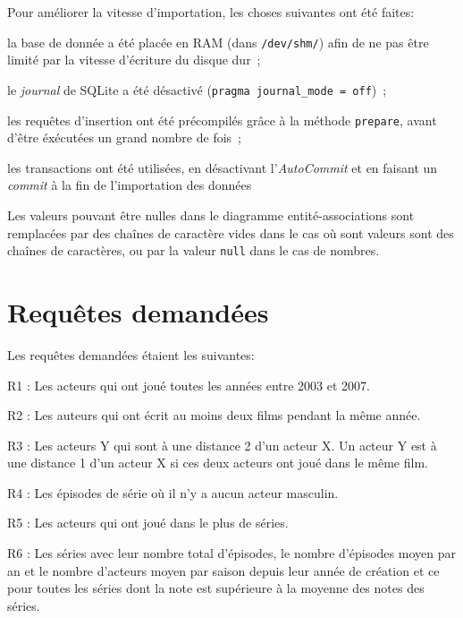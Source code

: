 \documentclass[a4paper,12pt]{article}
\begin{document}
Pour améliorer la vitesse d'importation, les choses suivantes ont été faites:
\begin{list}{-}{}
  \item la base de donnée a été placée en RAM (dans
    \texttt{/dev/shm/}) afin de ne pas être limité par la vitesse
    d'écriture du disque dur~;
  \item le \emph{journal} de SQLite a été désactivé (\texttt{pragma
    journal\_mode = off})~;
  \item les requêtes d'insertion ont été précompilés grâce à la
    méthode \texttt{prepare}, avant d'être éxécutées un grand nombre de fois~;
  \item les transactions ont été utilisées, en désactivant
    l'\emph{AutoCommit} et en faisant un \emph{commit} à la fin de
    l'importation des données
\end{list}

Les valeurs pouvant être nulles dans le diagramme entité-associations
sont remplacées par des chaînes de caractère vides dans le cas où sont
valeurs sont des chaînes de caractères, ou par la valeur \texttt{null}
dans le cas de nombres.
\section{Requêtes demandées}
Les requêtes demandées étaient les suivantes:
\begin{list}{-}{}
  \item R1 : Les acteurs qui ont joué toutes les années entre 2003 et
    2007.
  \item R2 : Les auteurs qui ont écrit au moins deux films pendant la
    même année.
  \item R3 : Les acteurs Y qui sont à une distance 2 d'un acteur X. Un
    acteur Y est à une distance 1 d'un acteur X si ces deux acteurs
    ont joué dans le même film.
  \item R4 : Les épisodes de série où il n'y a aucun acteur masculin.
  \item R5 : Les acteurs qui ont joué dans le plus de séries.
  \item R6 : Les séries avec leur nombre total d'épisodes, le nombre
    d'épisodes moyen par an et le nombre d'acteurs moyen par saison
    depuis leur année de création et ce pour toutes les séries dont la
    note est supérieure à la moyenne des notes des séries.
\end{list}
\end{document}
